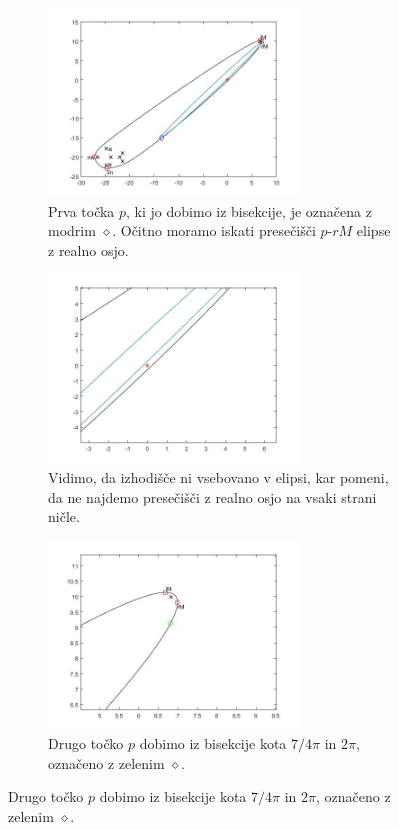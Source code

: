 \documentclass[12pt,a4paper]{amsart}
\theoremstyle{definition}
\theoremstyle{plain}
\begin{document}
\begin{figure}[h]
\renewcommand*\thesubfigure{\Alph{subfigure}}
\begin{subfigure}[t]{0.45\textwidth}
\includegraphics[width=0.9\linewidth,height=5cm]{prva.jpg}
\caption{Prva točka $p$, ki jo dobimo iz bisekcije, je označena z modrim $\diamond$. Očitno moramo iskati presečišči $p$-$rM$ elipse z realno osjo.}
\label{fig:p81}
\end{subfigure}%
\hfill
\begin{subfigure}[t]{0.45\textwidth}
\includegraphics[width=0.9\linewidth,height=5cm]{prva-zoom.jpg}
\caption{Vidimo, da izhodišče ni vsebovano v elipsi, kar pomeni, da ne najdemo presečišči z realno osjo na vsaki strani ničle.}
\label{fig:p82}
\end{subfigure}
\begin{subfigure}[t]{0.45\textwidth}
\includegraphics[width=0.9\linewidth,height=5cm]{druga-zoom.jpg}
\caption{Drugo točko $p$ dobimo iz bisekcije kota $7/4 \pi$ in $2\pi$, označeno z zelenim $\diamond$.}
\label{fig:p83}
\end{subfigure}%

\end{figure}
\end{document}
